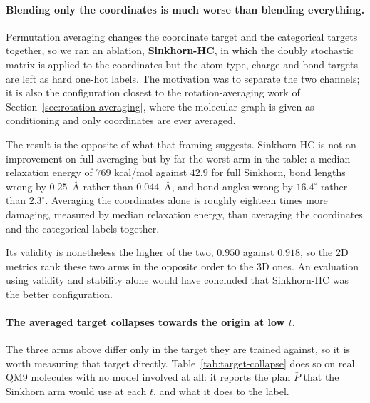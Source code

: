 \paragraph{Blending only the coordinates is much worse than blending everything.}
Permutation averaging changes the coordinate target and the categorical targets together, so we ran
an ablation, \textbf{Sinkhorn-HC}, in which the doubly stochastic matrix is applied to the
coordinates but the atom type, charge and bond targets are left as hard one-hot labels. The
motivation was to separate the two channels; it is also the configuration closest to the
rotation-averaging work of Section~\ref{sec:rotation-averaging}, where the molecular graph is given
as conditioning and only coordinates are ever averaged.

The result is the opposite of what that framing suggests. Sinkhorn-HC is not an improvement on full
averaging but by far the worst arm in the table: a median relaxation energy of $769$ kcal/mol
against $42.9$ for full Sinkhorn, bond lengths wrong by $0.25$~\AA{} rather than $0.044$~\AA{}, and
bond angles wrong by $16.4^\circ$ rather than $2.3^\circ$. Averaging the coordinates alone is
roughly eighteen times more damaging, measured by median relaxation energy, than averaging the
coordinates and the categorical labels together.

Its validity is nonetheless the higher of the two, $0.950$ against $0.918$, so the 2D metrics rank
these two arms in the opposite order to the 3D ones. An evaluation using validity and stability
alone would have concluded that Sinkhorn-HC was the better configuration.

\paragraph{The averaged target collapses towards the origin at low $t$.}
The three arms above differ only in the target they are trained against, so it is worth measuring
that target directly. Table~\ref{tab:target-collapse} does so on real QM9 molecules with no model
involved at all: it reports the plan $\bar{P}$ that the Sinkhorn arm would use at each $t$, and what
it does to the label.

